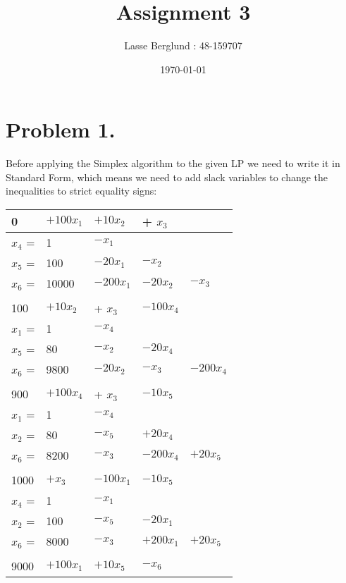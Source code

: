 \documentclass[12pt]{report}
\title{Assignment 3}
\author{Lasse Berglund : 48-159707}
\date{\today}
\begin{document}
\maketitle
\section*{Problem 1.}

Before applying the Simplex algorithm to the given LP we need to write it in Standard Form, which means we need to add slack variables to change the inequalities to strict equality signs:

\begin{tabular}{ l l l l l }
  0 & $+ 100x_1$ & $+ 10x_2$ & + $x_3$ \\  \hline

  $x_4$ = & 1 & $-x_1$ \\ 
  $x_5$ = & 100 & $-20x_1$ & $- x_2$ \\ 
  $x_6$ = & 10000 & $-200x_1$ & $-20x_2$ & $-x_3$ \\ 

  \\
  100 & $+ 10x_2$ & + $x_3$ & $-100x_4$\\  \hline

  $x_1$ = & 1 &  $-x_4$ \\ 
  $x_5$ = & 80  & $- x_2$ & $-20x_4$ \\ 
  $x_6$ = & 9800  & $-20x_2$ & $-x_3$ & $-200x_4$ \\ 


  \\
  900 & $+ 100x_4$ & + $x_3$ & $-10x_5$\\  \hline

  $x_1$ = & 1 &  $-x_4$ \\ 
  $x_2$ = & 80  & $- x_5$ & $+20x_4$ \\ 
  $x_6$ = & 8200  & $-x_3$ & $-200x_4$ & $+20x_5$ \\ 

  \\
  1000 & $+x_3$ & $-100x_1$ & $-10x_5$ \\  \hline

  $x_4$ = & 1 &  $-x_1$ \\ 
  $x_2$ = & 100 & $- x_5$ & $-20x_1$ \\ 
  $x_6$ = & 8000  & $-x_3$ & $+200x_1$ & $+20x_5$ \\ 
  
  \\
  9000 & $+100x_1$ & $+10x_5$ & $-x_6$ \\  \hline


\end{tabular}
\end{document}
